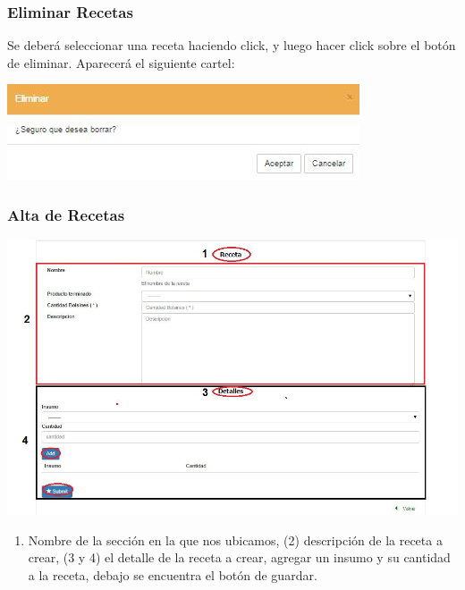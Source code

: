\documentclass[letterpaper,10pt,english]{sphinxmanual}
\begin{document}
\subsubsection{Eliminar Recetas}
\label{recetas:eliminar-recetas}
Se deberá seleccionar una receta haciendo click, y luego hacer click sobre el botón de eliminar. Aparecerá el siguiente cartel:

\includegraphics{receta_eliminar.jpg}


\subsubsection{Alta de Recetas}
\label{recetas:alta-de-recetas}
\includegraphics{receta_alta.jpg}
\begin{enumerate}
\item {} 
Nombre de la sección en la que nos ubicamos, (2) descripción de la receta a crear, (3 y 4) el detalle de la receta a crear, agregar un insumo y su cantidad a la receta,  debajo se encuentra el botón de guardar.

\end{enumerate}
\end{document}
